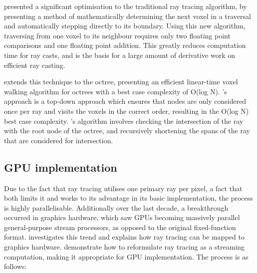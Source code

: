 \cite{amanatides87afast} presented a significant optimisation to the traditional ray tracing algorithm, by presenting a method of mathematically determining the next voxel in a traversal and automatically stepping directly to its boundary. Using this new algorithm, traversing from one voxel to its neighbour requires only two floating point comparisons and one floating point addition. This greatly reduces computation time for ray casts, and is the basis for a large amount of derivative work on efficient ray casting.

\cite{arvo88octreewalking} extends this technique to the octree, presenting an efficient linear-time voxel walking algorithm for octrees with a best case complexity of O(log N). \citeauthor{arvo88octreewalking}'s approach is a top-down approach which ensures that nodes are only considered once per ray and visits the voxels in the correct order, resulting in the O(log N) best case complexity. \citeauthor{arvo88octreewalking}'s algorithm involves checking the intersection of the ray with the root node of the octree, and recursively shortening the spans of the ray that are considered for intersection.

\subsection{GPU implementation}
Due to the fact that ray tracing utilises one primary ray per pixel, a fact that both limits it and works to its advantage in its basic implementation, the process is highly parallelisable. Additionally over the last decade, a breakthrough occurred in graphics hardware, which saw GPUs becoming massively parallel general-purpose stream processors, as opposed to the original fixed-function format. \cite{purcell02gpuraytracing} investigates this trend and explains how ray tracing can be mapped to graphics hardware. \citeauthor{purcell02gpuraytracing} demonstrate how to reformulate ray tracing as a streaming computation, making it appropriate for GPU implementation. The process is as follows:

\let\oldlabelitemi\labelitemi
\renewcommand{\labelitemi}{}

